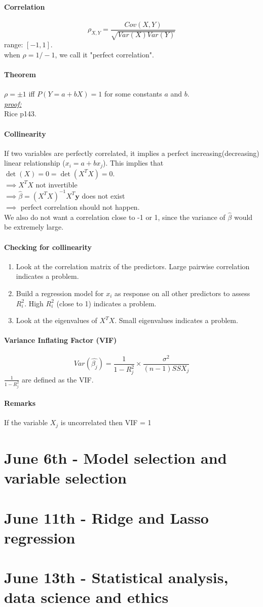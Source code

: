 \documentclass[11pt]{article}
\newcommand{\tb}[1]{\textbf{#1}}
\newcommand{\proof}[0]{\textit{\underline{proof:} }}
\newcommand{\vy}[0]{\tb{y}}
\begin{document}
\paragraph{Correlation}
$$\rho_{X,Y} = \frac{Cov(X, Y)}{\sqrt{Var(X)Var(Y)}}$$
range: $[-1, 1]$.\\
when $\rho = 1/-1$, we call it "perfect correlation".
\paragraph{Theorem}
$\rho = \pm 1$ iff $P(Y = a + bX) = 1$ for some constants $a$ and $b$. \\
\proof \\
Rice p143.
\paragraph{Collinearity}
If two variables are perfectly correlated, it implies a perfect increasing(decreasing) linear relationship ($x_i = a+ bx_j$). This implies that $\det(X) = 0 = \det(X^TX) = 0$.\\
$\implies X^TX$ not invertible \\
$\implies \hat{\beta} = (X^TX)^{-1}X^T\vy$ does not exist \\
$\implies$ perfect correlation should not happen. \\
We also do not want a correlation close to -1 or 1, since the variance of $\hat{\beta}$ would be extremely large.
\paragraph{Checking for collinearity}
\begin{enumerate}
	\item Look at the correlation matrix of the predictors. Large pairwise correlation indicates a problem.
	\item Build a regression model for $x_i$ as response on all other predictors to assess $R_i^2$. High $R_i^2$ (close to 1) indicates a problem.
	\item Look at the eigenvalues of $X^TX$. Small eigenvalues indicates a problem.
\end{enumerate}

\paragraph{Variance Inflating Factor (VIF)}
$$Var(\hat{\beta_j}) = \frac{1}{1-R_j^2} \times \frac{\sigma^2}{(n-1)SSX_j}$$
$\frac{1}{1-R_j^2}$ are defined as the VIF.

\paragraph{Remarks}
If the variable $X_j$ is uncorrelated then VIF = 1





\section{June 6th - Model selection and variable selection}
\section{June 11th - Ridge and Lasso regression}
\section{June 13th - Statistical analysis, data science and ethics}
\end{document}
